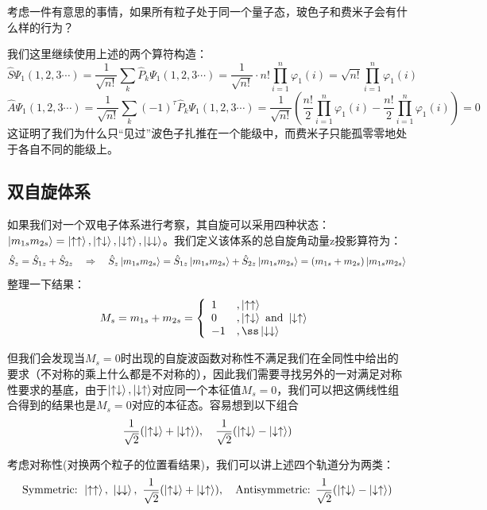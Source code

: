 考虑一件有意思的事情，如果所有粒子处于同一个量子态，玻色子和费米子会有什么样的行为？

我们这里继续使用上述的两个算符构造：
\[\hat{S}\varPsi_{1}(1,2,3 \cdots)=\frac{1}{\sqrt{n!}}\sum_{k}\hat{P}_{k}\varPsi_{1}(1,2,3 \cdots)=\frac{1}{\sqrt{n!}}\cdot n!\prod_{i=1}^n\varphi_1(i)=\sqrt{n!}\prod_{i=1}^n\varphi_1(i)\]
\[\hat{A}\varPsi_{1}(1,2,3 \cdots)=\frac{1}{\sqrt{n!}}\sum_{k}(-1)^{\tau}\hat{P}_{k}\varPsi_{1}(1,2,3 \cdots)=\frac{1}{\sqrt{n!}}\left (\frac{n!}{2}\prod_{i=1}^n\varphi_1(i)-\frac{n!}{2}\prod_{i=1}^n\varphi_1(i) \right )=0\]
这证明了我们为什么只“见过”波色子扎推在一个能级中，而费米子只能孤零零地处于各自不同的能级上。

\subsection{双自旋体系}
如果我们对一个双电子体系进行考察，其自旋可以采用四种状态：$\ket{m_{1s}m_{2s}}=\ket{\uparrow\uparrow},\ket{\uparrow\downarrow},\ket{\downarrow\uparrow},\ket{\downarrow\downarrow}$。我们定义该体系的总自旋角动量z投影算符为：
\[\hat{S}_z=\hat{S}_{1z}+\hat{S}_{2z} \quad \Rightarrow \quad \hat{S}_z\ket{m_{1s}m_{2s}}=\hat{S}_{1z}\ket{m_{1s}m_{2s}}+\hat{S}_{2z}\ket{m_{1s}m_{2s}}=(m_{1s}+m_{2s})\ket{m_{1s}m_{2s}}\]
整理一下结果：
\[M_s=m_{1s}+m_{2s}=\left\{
\begin{array}{ll}
1  & ,\ket{\uparrow\uparrow}\\
0  & ,\ket{\uparrow\downarrow}\text{ and }\ket{\downarrow\uparrow}\\
-1 & ,ß\ket{\downarrow\downarrow}
\end{array}
\right.\]

但我们会发现当$M_s=0$时出现的自旋波函数对称性不满足我们在全同性中给出的要求（不对称的乘上什么都是不对称的），因此我们需要寻找另外的一对满足对称性要求的基底，由于$\ket{\uparrow\downarrow},\ket{\downarrow\uparrow}$对应同一个本征值$M_s=0$，我们可以把这俩线性组合得到的结果也是$M_s=0$对应的本征态。容易想到以下组合
\[\frac{1}{\sqrt{2}}(\ket{\uparrow\downarrow}+\ket{\downarrow\uparrow}), \quad \frac{1}{\sqrt{2}}(\ket{\uparrow\downarrow}-\ket{\downarrow\uparrow})\]

考虑对称性(对换两个粒子的位置看结果)，我们可以讲上述四个轨道分为两类：
\[\text{Symmetric: }\ket{\uparrow\uparrow}, \ \ket{\downarrow\downarrow}, \ \frac{1}{\sqrt{2}}(\ket{\uparrow\downarrow}+\ket{\downarrow\uparrow}), \quad \text{Antisymmetric: }\frac{1}{\sqrt{2}}(\ket{\uparrow\downarrow}-\ket{\downarrow\uparrow})\]

